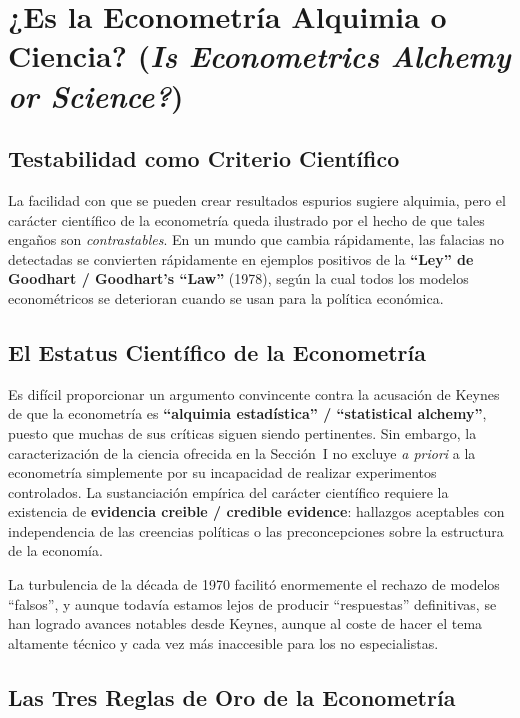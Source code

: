 \documentclass[12pt]{article}
\begin{document}
\section{¿Es la Econometr\'ia Alquimia o Ciencia? (\textit{Is Econometrics Alchemy or Science?})}

\subsection{Testabilidad como Criterio Cient\'ifico}

La facilidad con que se pueden crear resultados espurios sugiere alquimia, pero el car\'acter cient\'ifico de la econometr\'ia queda ilustrado por el hecho de que tales enga\~nos son \textit{contrastables}. En un mundo que cambia r\'apidamente, las falacias no detectadas se convierten r\'apidamente en ejemplos positivos de la \textbf{``Ley'' de Goodhart / Goodhart's ``Law''} (1978), seg\'un la cual todos los modelos econom\'etricos se deterioran cuando se usan para la pol\'itica econ\'omica.

\subsection{El Estatus Cient\'ifico de la Econometr\'ia}

Es dif\'icil proporcionar un argumento convincente contra la acusaci\'on de Keynes de que la econometr\'ia es \textbf{``alquimia estad\'istica'' / ``statistical alchemy''}, puesto que muchas de sus cr\'iticas siguen siendo pertinentes. Sin embargo, la caracterizaci\'on de la ciencia ofrecida en la Secci\'on~I no excluye \textit{a priori} a la econometr\'ia simplemente por su incapacidad de realizar experimentos controlados. La sustanciaci\'on emp\'irica del car\'acter cient\'ifico requiere la existencia de \textbf{evidencia creible / credible evidence}: hallazgos aceptables con independencia de las creencias pol\'iticas o las preconcepciones sobre la estructura de la econom\'ia.

La turbulencia de la d\'ecada de 1970 facilit\'o enormemente el rechazo de modelos ``falsos'', y aunque todav\'ia estamos lejos de producir ``respuestas'' definitivas, se han logrado avances notables desde Keynes, aunque al coste de hacer el tema altamente t\'ecnico y cada vez m\'as inaccesible para los no especialistas.

\subsection{Las Tres Reglas de Oro de la Econometr\'ia}
\end{document}
